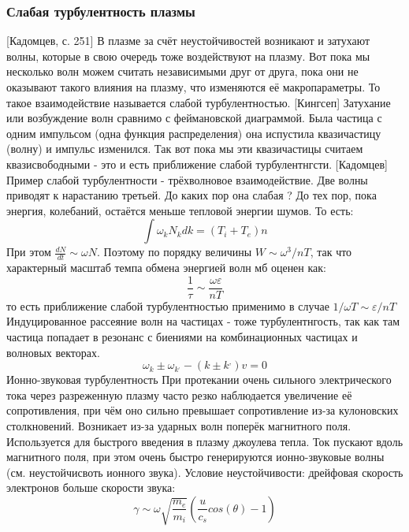 \documentclass[10pt, a4paper]{article}
\begin{document}
\subsubsection{Слабая турбулентность плазмы}
[Кадомцев, с. 251]
В плазме за счёт неустойчивостей возникают и затухают волны, которые в свою очередь тоже воздействуют на плазму. Вот пока мы несколько волн можем считать независимыми друг от друга, пока они не оказывают такого влияния на плазму, что изменяются её макропараметры. То такое взаимодействие называется слабой турбулентностью.
[Кингсеп]
Затухание или возбуждение волн сравнимо с феймановской диаграммой. Была частица с одним импульсом (одна функция распределения) она испустила квазичастицу (волну) и импульс изменился. Так вот пока мы эти квазичастицы считаем квазисвободными - это и есть приближение слабой турбулентнгсти.
[Кадомцев]
Пример слабой турбулентности - трёхволновое взаимодействие. Две волны приводят к нарастанию третьей. До каких пор она слабая ? До тех пор, пока энергия, колебаний, остаётся меньше тепловой энергии шумов. То есть:
\begin{equation}
\int \omega_k N_k dk = (T_i + T_e)n
\end{equation}
При этом $\frac{dN}{dt} \sim \omega N$. Поэтому по порядку величины $W \sim \omega^3/nT$, так что характерный масштаб темпа обмена энергией волн мб оценен как:
\begin{equation}
\frac{1}{\tau} \sim \frac{\omega \varepsilon}{nT}
\end{equation}
то есть приближение слабой турбулентностью применимо в случае $1/\omega T \sim \varepsilon/nT$
Индуцированное рассеяние волн на частицах - тоже турбулентнгость, так как там частица попадает в резонанс с биениями на комбинационных частицах и волновых векторах.
\begin{equation}
\omega_k \pm \omega_{k^{,}} - (k \pm k^{,})v=0
\end{equation}
Ионно-звуковая турбулентность
При протекании очень сильного электрического тока через разреженную плазму часто резко наблюдается увеличение её сопротивления, при чём оно сильно превышает сопротивление из-за кулоновских столкновений. Возникает из-за ударных волн поперёк магнитного поля.
Используется для быстрого введения в плазму джоулева тепла. Ток пускают вдоль магнитного поля, при этом очень быстро генерируются ионно-звуковые волны (см. неустойчисвоть ионного звука).
Условие неустойчивости: дрейфовая скорость электронов больше скорости звука:
\begin{equation}
\gamma \sim \omega \sqrt{\frac{m_e}{m_i}} (\frac{u}{c_s} cos(\theta) -1)
\end{equation}
\end{document}
